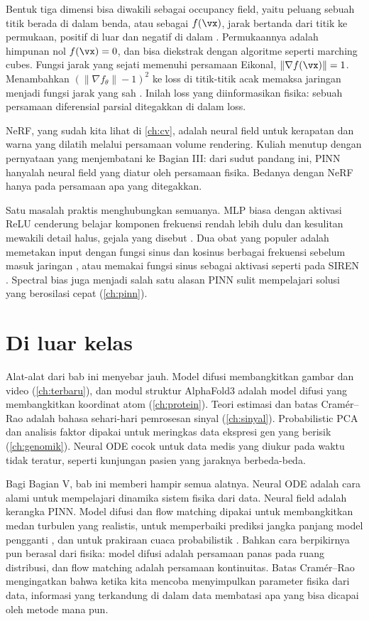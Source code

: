 Bentuk tiga dimensi bisa diwakili sebagai occupancy field, yaitu peluang sebuah titik berada di
dalam benda, atau sebagai  $f(\vx)$, jarak bertanda dari titik ke
permukaan, positif di luar dan negatif di dalam \citep{park2019}. Permukaannya adalah himpunan nol
$f(\vx)=0$, dan bisa diekstrak dengan algoritme seperti marching cubes. Fungsi jarak yang sejati
memenuhi persamaan Eikonal, $\|\nabla f(\vx)\|=1$. Menambahkan $(\|\nabla f_\theta\|-1)^2$ ke loss di
titik-titik acak memaksa jaringan menjadi fungsi jarak yang sah \citep{gropp2020}. Inilah loss
yang diinformasikan fisika: sebuah persamaan diferensial parsial ditegakkan di dalam loss.

NeRF, yang sudah kita lihat di \cref{ch:cv}, adalah neural field untuk kerapatan dan warna yang
dilatih melalui persamaan volume rendering. Kuliah menutup dengan pernyataan yang menjembatani ke
Bagian III: dari sudut pandang ini, PINN hanyalah neural field yang diatur oleh persamaan fisika.
Bedanya dengan NeRF hanya pada persamaan apa yang ditegakkan.

Satu masalah praktis menghubungkan semuanya. MLP biasa dengan aktivasi ReLU cenderung belajar
komponen frekuensi rendah lebih dulu dan kesulitan mewakili detail halus, gejala yang disebut
 \citep{rahaman2019}. Dua obat yang populer adalah memetakan input dengan
fungsi sinus dan kosinus berbagai frekuensi sebelum masuk jaringan \citep{tancik2020}, atau memakai
fungsi sinus sebagai aktivasi seperti pada SIREN \citep{sitzmann2020}. Spectral bias juga menjadi
salah satu alasan PINN sulit mempelajari solusi yang berosilasi cepat (\cref{ch:pinn}).

\section{Di luar kelas}

Alat-alat dari bab ini menyebar jauh. Model difusi membangkitkan gambar dan video (\cref{ch:terbaru}), dan
modul struktur AlphaFold3 adalah model difusi yang membangkitkan koordinat atom (\cref{ch:protein}). Teori
estimasi dan batas Cramér--Rao adalah bahasa sehari-hari pemrosesan sinyal (\cref{ch:sinyal}).
Probabilistic PCA dan analisis faktor dipakai untuk meringkas data ekspresi gen yang berisik
(\cref{ch:genomik}). Neural ODE cocok untuk data medis yang diukur pada waktu tidak teratur, seperti kunjungan
pasien yang jaraknya berbeda-beda.

Bagi Bagian V, bab ini memberi hampir semua alatnya. Neural ODE adalah cara alami untuk mempelajari
dinamika sistem fisika dari data. Neural field adalah kerangka PINN. Model difusi dan flow matching
dipakai untuk membangkitkan medan turbulen yang realistis, untuk memperbaiki prediksi jangka panjang
model pengganti \citep{lippe2023}, dan untuk prakiraan cuaca probabilistik \citep{price2025}. Bahkan
cara berpikirnya pun berasal dari fisika: model difusi adalah persamaan panas pada ruang
distribusi, dan flow matching adalah persamaan kontinuitas. Batas Cramér--Rao mengingatkan bahwa
ketika kita mencoba menyimpulkan parameter fisika dari data, informasi yang terkandung di dalam data
membatasi apa yang bisa dicapai oleh metode mana pun.

